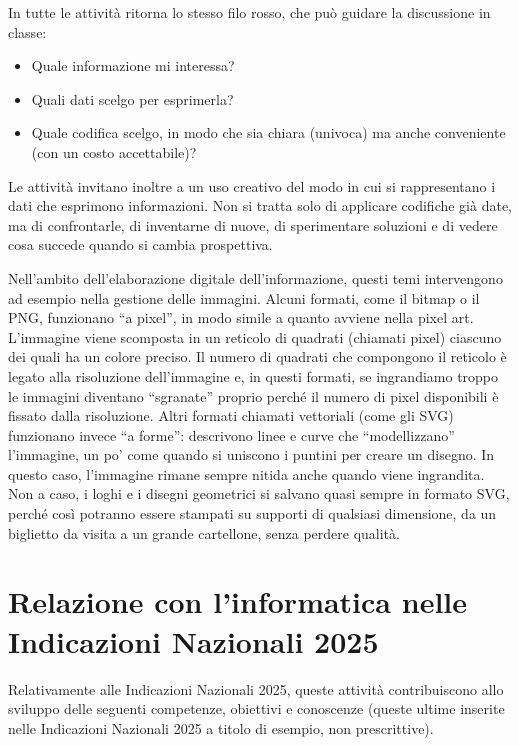 In tutte le attività ritorna lo stesso filo rosso, che può guidare la discussione in classe:

\begin{itemize}
\item
  Quale informazione mi interessa?
\item
  Quali dati scelgo per esprimerla?
\item
  Quale codifica scelgo, in modo che sia chiara (univoca) ma anche conveniente (con un costo accettabile)?
\end{itemize}

Le attività invitano inoltre a un uso creativo del modo in cui si rappresentano i dati che esprimono informazioni. Non si tratta solo di applicare codifiche già date, ma di confrontarle, di inventarne di nuove, di sperimentare soluzioni e di vedere cosa succede quando si cambia prospettiva.

Nell'ambito dell'elaborazione digitale dell'informazione, questi temi intervengono ad esempio nella gestione delle immagini. Alcuni formati, come il bitmap o il PNG, funzionano ``a pixel'', in modo simile a quanto avviene nella pixel art. L'immagine viene scomposta in un reticolo di quadrati (chiamati pixel) ciascuno dei quali ha un colore preciso. Il numero di quadrati che compongono il reticolo è legato alla risoluzione dell'immagine e, in questi formati, se ingrandiamo troppo le immagini diventano ``sgranate'' proprio perché il numero di pixel disponibili è fissato dalla risoluzione. Altri formati chiamati vettoriali (come gli SVG) funzionano invece ``a forme'': descrivono linee e curve che ``modellizzano'' l'immagine, un po' come quando si uniscono i puntini per creare un disegno. In questo caso, l'immagine rimane sempre nitida anche quando viene ingrandita. Non a caso, i loghi e i disegni geometrici si salvano quasi sempre in formato SVG, perché così potranno essere stampati su supporti di qualsiasi dimensione, da un biglietto da visita a un grande cartellone, senza perdere qualità.

\section{Relazione con l'informatica nelle Indicazioni Nazionali 2025 }\label{relazione-con-linformatica-nelle-indicazioni-nazionali-2}

Relativamente alle Indicazioni Nazionali 2025, queste attività contribuiscono allo sviluppo delle seguenti competenze, obiettivi e conoscenze (queste ultime inserite nelle Indicazioni Nazionali 2025 a titolo di esempio, non prescrittive).


